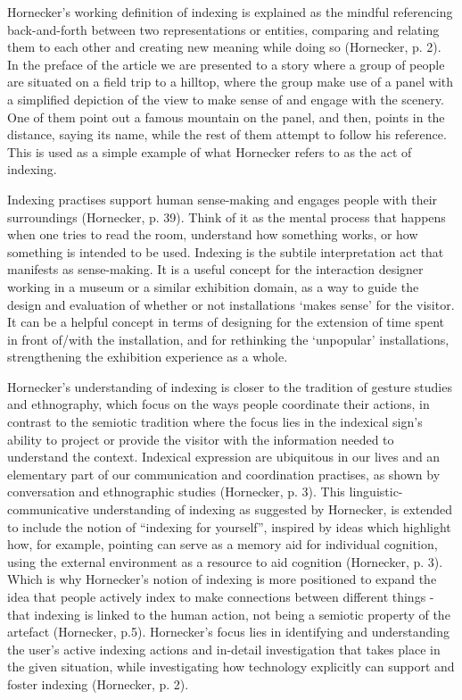 Hornecker’s working definition of indexing is explained as the mindful referencing back-and-forth between two representations or entities, comparing and relating them to each other and creating new meaning while doing so (Hornecker, p. 2). In the preface of the article we are presented to a story where a group of people are situated on a field trip to a hilltop, where the group make use of a panel with a simplified depiction of the view to make sense of and engage with the scenery. One of them point out a famous mountain on the panel, and then, points in the distance, saying its name, while the rest of them attempt to follow his reference. This is used as a simple example of what Hornecker refers to as the act of indexing.

Indexing practises support human sense-making and engages people with their surroundings (Hornecker, p. 39). Think of it as the mental process that happens when one tries to read the room, understand how something works, or how something is intended to be used. Indexing is the subtile interpretation act that manifests as sense-making. It is a useful concept for the interaction designer working in a museum or a similar exhibition domain, as a way to guide the design and evaluation of whether or not installations ‘makes sense’ for the visitor. It can be a helpful concept in terms of designing for the extension of time spent in front of/with the installation, and for rethinking the ‘unpopular’ installations, strengthening the exhibition experience as a whole.

Hornecker’s understanding of indexing is closer to the tradition of gesture studies and ethnography, which focus on the ways people coordinate their actions, in contrast to the semiotic tradition where the focus lies in the indexical sign’s ability to project or provide the visitor with the information needed to understand the context. Indexical expression are ubiquitous in our lives and an elementary part of our communication and coordination practises, as shown by conversation and ethnographic studies (Hornecker, p. 3). This linguistic-communicative understanding of indexing as suggested by Hornecker, is extended to include the notion of “indexing for yourself”, inspired by ideas which highlight how, for example, pointing can serve as a memory aid for individual cognition, using the external environment as a resource to aid cognition (Hornecker, p. 3). Which is why Hornecker’s notion of indexing is more positioned to expand the idea that people actively index to make connections between different things - that indexing is linked to the human action, not being a semiotic property of the artefact (Hornecker, p.5). Hornecker’s focus lies in identifying and understanding the user’s active indexing actions and in-detail investigation that takes place in the given situation, while investigating how technology explicitly can support and foster indexing (Hornecker, p. 2).

